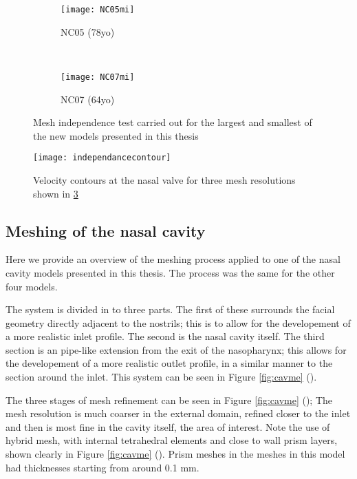 \begin{figure}

  \begin{subfigure}[t]{0.5\textwidth}
    \texttt{[image: NC05mi]}
    \caption{NC05 (78yo)}
    \label{fig:mi5}
  \end{subfigure}%
  ~%
  \begin{subfigure}[t]{0.5\textwidth}
    \texttt{[image: NC07mi]}
    \caption{NC07 (64yo)}
    \label{fig:mi7}
  \end{subfigure}
  \caption{Mesh independence test carried out for the largest and smallest of the new models presented in this thesis} \label{fig:mind}

\end{figure}  


\begin{figure}
  \texttt{[image: independancecontour]}
  \caption{Velocity contours at the nasal valve for three mesh resolutions shown in \ref{fig:mind}} \label{fig:mindcont}
    \label{fig:micont}
\end{figure} 

\subsection{Meshing of the nasal cavity} 

Here we provide an overview of the meshing process applied to one of the nasal cavity models presented in this thesis. The process was the same for the other four models.

The system is divided in to three parts. The first of these surrounds the facial geometry directly adjacent to the nostrils; this is to allow for the developement of a more realistic inlet profile. The second is the nasal cavity itself. The third section is an pipe-like extension from the exit of the nasopharynx; this allows for the developement of a more realistic outlet profile, in a similar manner to the section around the inlet. This system can be seen in Figure \ref{fig:cavme} ().

The three stages of mesh refinement can be seen in Figure \ref{fig:cavme} (); The mesh resolution is much coarser in the external domain, refined closer to the inlet and then is most fine in the cavity itself, the area of interest. Note the use of hybrid mesh, with internal tetrahedral elements and close to wall prism layers, shown clearly in Figure \ref{fig:cavme} (). Prism meshes in the meshes in this model had thicknesses starting from around 0.1 mm.

